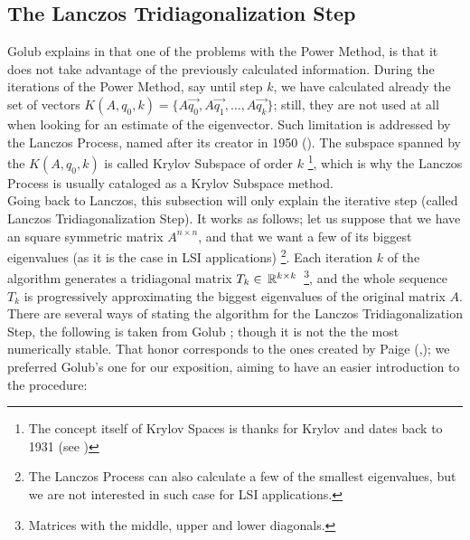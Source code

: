\subsection{The Lanczos Tridiagonalization Step}

Golub explains in \cite{golub13} that one of the problems with the
Power Method, is that it does not take advantage of the previously
calculated information. During the iterations of the Power Method, say
until step $k$, we have calculated already the set of vectors
$K(A,q_0,k) = \{A\vec{q_0},A\vec{q_1},\dots,A\vec{q_k}\}$; still, they
are not used 
at all when looking for an estimate of the eigenvector. Such
limitation is addressed by the Lanczos Process, named after its
creator in 1950 (\cite{lanczos1950}). The subspace spanned by the
$K(A,q_0,k)$ is called Krylov Subspace of order $k$ \footnote{The
  concept itself of Krylov Spaces is thanks for 
  Krylov and dates back to 1931 (see \cite{krylov1931})}, which is why
the Lanczos Process is usually cataloged as a Krylov Subspace
method.  \\

Going back to Lanczos, this subsection will only explain the iterative
step (called Lanczos Tridiagonalization Step). It works as follows; let us
suppose that we have an square symmetric matrix $A^{n \times n}$, and
that we want a few of its biggest eigenvalues (as it is the case in LSI
applications) \footnote{The Lanczos Process can also calculate a few
  of the smallest eigenvalues, but we are not interested in such case
  for LSI applications.}. Each iteration $k$ of the algorithm generates a
tridiagonal matrix $T_k \in \,\mathbb{R}^{k \times
  k}\,$ \footnote{Matrices with the middle, upper and lower
  diagonals.}, and the whole sequence ${T_k}$ is  progressively 
approximating the biggest eigenvalues of the original matrix
$A$. \\

There are several ways of stating the algorithm for the Lanczos
Tridiagonalization Step, the following is taken from Golub \cite{golub13};
though it is not the the most numerically stable. That honor
corresponds to the ones created by Paige
(\cite{paige71},\cite{paige76}); we preferred Golub's one for our
exposition, aiming to have an easier introduction to the procedure: 

